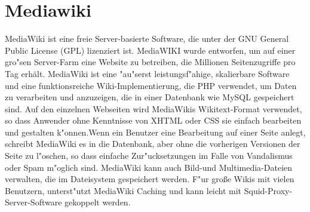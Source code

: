 
\section{Mediawiki}
MediaWiki ist eine freie Server-basierte Software, die unter der GNU General Public License (GPL) lizenziert ist. MediaWIKI wurde entworfen, um auf einer gro"sen Server-Farm eine Website zu betreiben, die Millionen Seitenzugriffe pro Tag erhält. MediaWiki ist eine "au"serst leistungsf"ahige, skalierbare Software und eine funktionsreiche Wiki-Implementierung, die PHP verwendet, um Daten zu verarbeiten und anzuzeigen, die in einer Datenbank wie MySQL gespeichert sind. Auf den einzelnen Webseiten wird MediaWikis Wikitext-Format verwendet, so dass Anwender ohne Kenntnisse von XHTML oder CSS sie einfach bearbeiten und gestalten k"onnen.Wenn ein Benutzer eine Bearbeitung auf einer Seite anlegt, schreibt MediaWiki es in die Datenbank, aber ohne die vorherigen Versionen der Seite zu l"oschen, so dass einfache Zur"ucksetzungen im Falle von Vandalismus oder Spam m"oglich sind. MediaWiki kann auch Bild-und Multimedia-Dateien verwalten, die im Dateisystem gespeichert werden. F"ur große Wikis mit vielen Benutzern, unterst"utzt MediaWiki Caching und kann leicht mit Squid-Proxy-Server-Software gekoppelt werden.
